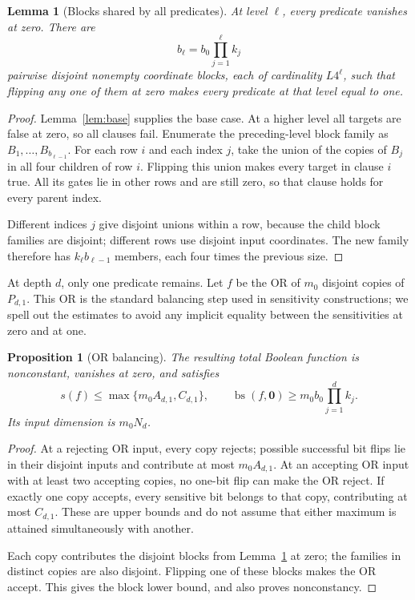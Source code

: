 \documentclass[11pt]{article}
\newtheorem{lemma}[theorem]{Lemma}
\newtheorem{proposition}[theorem]{Proposition}
\theoremstyle{definition}
\theoremstyle{remark}
\DeclareMathOperator{\bs}{bs}
\newcommand{\sens}{s}
\newcommand{\zero}{\mathbf{0}}
\begin{document}
\begin{lemma}[Blocks shared by all predicates]
\label{lem:blocks}
At level $\ell$, every predicate vanishes at zero.  There are
\[
             b_\ell=b_0\prod_{j=1}^\ell k_j
\]
pairwise disjoint nonempty coordinate blocks, each of cardinality
$L4^\ell$, such that flipping any one of them at zero makes every
predicate at that level equal to one.
\end{lemma}

\begin{proof}
Lemma~\ref{lem:base} supplies the base case.  At a higher level all
targets are false at zero, so all clauses fail.  Enumerate the
preceding-level block family as $B_1,\ldots,B_{b_{\ell-1}}$.
For each row $i$ and each index $j$, take the union of the copies of
$B_j$ in all four children of row $i$.  Flipping this union makes
every target in clause $i$ true.  All its gates lie in other rows and
are still zero, so that clause holds for every parent index.

Different indices $j$ give disjoint unions within a row, because the
child block families are disjoint; different rows use disjoint input
coordinates.  The new family therefore has $k_\ell b_{\ell-1}$
members, each four times the previous size.
\end{proof}

At depth $d$, only one predicate remains.  Let $f$ be the OR of $m_0$
disjoint copies of $P_{d,1}$.  This OR is the standard balancing step
used in sensitivity constructions; we spell out the estimates to avoid
any implicit equality between the sensitivities at zero and at one.

\begin{proposition}[OR balancing]
\label{prop:or}
The resulting total Boolean function is nonconstant, vanishes at zero,
and satisfies
\begin{equation}
 \sens(f)\le\max\{m_0A_{d,1},C_{d,1}\},\qquad
 \bs(f,\zero)\ge m_0b_0\prod_{j=1}^d k_j.
 \label{eq:OR}
\end{equation}
Its input dimension is $m_0N_d$.
\end{proposition}

\begin{proof}
At a rejecting OR input, every copy rejects; possible successful bit
flips lie in their disjoint inputs and contribute at most
$m_0A_{d,1}$.  At an accepting OR input with at least two accepting
copies, no one-bit flip can make the OR reject.  If exactly one copy
accepts, every sensitive bit belongs to that copy, contributing at most
$C_{d,1}$.  These are upper bounds and do not assume that either
maximum is attained simultaneously with another.

Each copy contributes the disjoint blocks from Lemma~\ref{lem:blocks}
at zero; the families in distinct copies are also disjoint.  Flipping
one of these blocks makes the OR accept.  This gives the block lower
bound, and also proves nonconstancy.
\end{proof}
\end{document}
